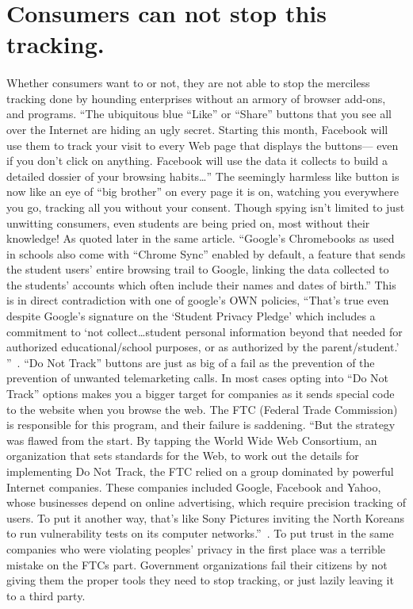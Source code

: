 \section{Consumers can not stop this tracking.}
\paragraph{}
Whether consumers want to or not, they are not able to stop the merciless
tracking done by hounding enterprises without an armory of browser add-ons,
and programs. ``The ubiquitous blue ``Like'' or ``Share'' buttons that you see
all over the Internet are hiding an ugly secret. Starting this month, Facebook
will use them to track your visit to every Web page that displays the buttons—
even if you don’t click on anything. Facebook will use the data it collects to
build a detailed dossier of your browsing habits\ldots{}''\cite{natecardozo2015}
The seemingly harmless
like button is now like an eye of ``big brother'' on every page it is on,
watching you everywhere you go, tracking all you without your consent.
Though spying isn't limited to just unwitting consumers, even students
are being pried on, most without their knowledge! As quoted later in the
same article. ``Google’s Chromebooks as used in schools also come with ``Chrome
Sync'' enabled by default, a feature that sends the student users’ entire
browsing trail to Google, linking the data collected to the students’ accounts
which often include their names and dates of birth.''\cite{natecardozo2015}
This is in direct contradiction with one of google's OWN policies, ``That’s true
even despite Google’s signature on the `Student Privacy Pledge' which
includes a commitment to `not collect\ldots{}student personal information beyond that
needed for authorized educational/school purposes, or as authorized by the
parent/student.' ''~\cite{natecardozo2015}. ``Do Not Track'' buttons are
just as big of a fail as the prevention of the prevention of unwanted
telemarketing calls. In most cases opting into ``Do Not Track'' options
makes you a bigger target for companies as it sends special code to the website
when you browse the web. The FTC (Federal Trade Commission) is responsible for
this program, and their failure is saddening. ``But the strategy was flawed from
the start. By tapping the World Wide Web Consortium, an organization that sets
standards for the Web, to work out the details for implementing Do Not Track,
the FTC relied on a group dominated by powerful Internet companies. These
companies included Google, Facebook and Yahoo, whose businesses depend on online
advertising, which require precision tracking of users. To put it another way,
that’s like Sony Pictures inviting the North Koreans to run vulnerability tests
on its computer networks.''~\cite{dawnchmielewski2016}. To put trust in the same
companies who were violating peoples' privacy in the first place was a terrible
mistake on the FTCs part. Government organizations fail their citizens by
not giving them the proper tools they need to stop tracking, or just lazily
leaving it to a third party.
\par

\newpage
\printbibliography{}
